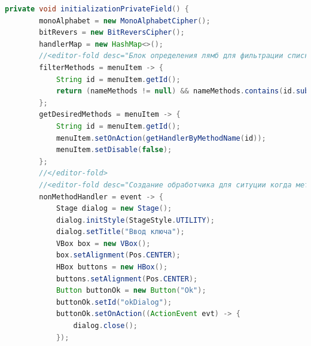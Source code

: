 \documentclass[a4paper,12pt]{article}
\begin{document}
\begin{lstlisting}[language=java, caption=код модуля MainWindowController.java]
    private void initializationPrivateField() {
        monoAlphabet = new MonoAlphabetCipher();
        bitRevers = new BitReversCipher();
        handlerMap = new HashMap<>();
        //<editor-fold desc="Блок определения лямб для фильтрации списков меню шифрования/расшифрования" defaultstate="collapsed">
        filterMethods = menuItem -> {
            String id = menuItem.getId();
            return (nameMethods != null) && nameMethods.contains(id.substring(6));
        };
        getDesiredMethods = menuItem -> {
            String id = menuItem.getId();
            menuItem.setOnAction(getHandlerByMethodName(id));
            menuItem.setDisable(false);
        };
        //</editor-fold>
        //<editor-fold desc="Создание обработчика для ситуции когда метод не реализован" defaultstate="collapsed" >
        nonMethodHandler = event -> {
            Stage dialog = new Stage();
            dialog.initStyle(StageStyle.UTILITY);
            dialog.setTitle("Ввод ключа");
            VBox box = new VBox();
            box.setAlignment(Pos.CENTER);
            HBox buttons = new HBox();
            buttons.setAlignment(Pos.CENTER);
            Button buttonOk = new Button("Ok");
            buttonOk.setId("okDialog");
            buttonOk.setOnAction((ActionEvent evt) -> {
                dialog.close();
            });


\end{lstlisting}
\end{document}
